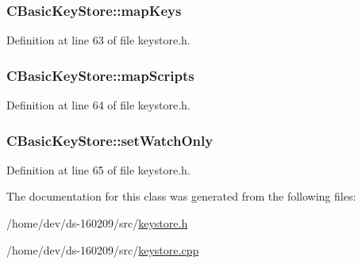 \subsubsection[{map\+Keys}]{ C\+Basic\+Key\+Store\+::map\+Keys\hspace{0.3cm}{\ttfamily [protected]}}\label{class_c_basic_key_store_ac520003e5c3d863bf71fde247c6e0672}


Definition at line 63 of file keystore.\+h.

\hypertarget{class_c_basic_key_store_a8e9fa81382129c1535a0ee7b0d9c8f3b}{}
\subsubsection[{map\+Scripts}]{ C\+Basic\+Key\+Store\+::map\+Scripts\hspace{0.3cm}{\ttfamily [protected]}}\label{class_c_basic_key_store_a8e9fa81382129c1535a0ee7b0d9c8f3b}


Definition at line 64 of file keystore.\+h.

\hypertarget{class_c_basic_key_store_ac3391cb491e315403ad9af6afd1313da}{}
\subsubsection[{set\+Watch\+Only}]{ C\+Basic\+Key\+Store\+::set\+Watch\+Only\hspace{0.3cm}{\ttfamily [protected]}}\label{class_c_basic_key_store_ac3391cb491e315403ad9af6afd1313da}


Definition at line 65 of file keystore.\+h.



The documentation for this class was generated from the following files\+:\begin{DoxyCompactItemize}
\item 
/home/dev/ds-\/160209/src/\hyperlink{keystore_8h}{keystore.\+h}\item 
/home/dev/ds-\/160209/src/\hyperlink{keystore_8cpp}{keystore.\+cpp}\end{DoxyCompactItemize}
